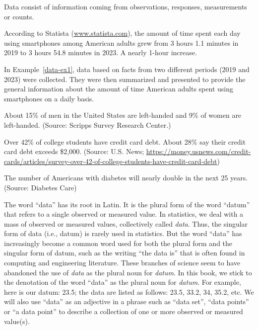 \begin{definition}[Data] 
Data consist of information coming from observations, responses, measurements or counts. 
\end{definition} 

\begin{example} \label{data-ex1}
According to Statista ({\url{www.statista.com}}), the amount of time spent each day using smartphones among American adults grew from 3 hours 1.1 minutes in 2019 to 3 hours 54.8 minutes in 2023. A nearly 1-hour increase.   
\end{example}

In Example~\ref{data-ex1}, data based on facts from two different periods (2019 and 2023) were collected. They were then summarized and presented to provide the general information about the amount of time American adults spent using smartphones on a daily basis.     

\begin{example} \label{data-ex2}
   About 15\% of men in the United States are left-handed and 9\% of women are left-handed. (Source: Scripps Survey Research Center.)   
 \end{example}

\begin{example} \label{data-ex3}
 Over 42\% of college students have credit card debt. About 28\% say their credit card debt exceeds \$2,000. (Source: U.S. News; {\url{https://money.usnews.com/credit-cards/articles/survey-over-42-of-college-students-have-credit-card-debt}})
\end{example}

\begin{example} \label{data-ex4}
 The number of Americans with diabetes will nearly double in the next 25 years. (Source: Diabetes Care)
\end{example}

The word ``data'' has its root in Latin. It is the plural form of the word ``datum'' that refers to a single observed or measured value. In statistics, we deal with a mass of observed or measured values, collectively called {\it{data}}. Thus, the singular form of data (i.e., datum) is rarely used in statistics. But the word ``data'' has increasingly become a common word used for both the plural form and the singular form of datum, such as the writing ``the data is'' that is often found in computing and engineering literature. These branches of science seem to have abandoned the use of {\it{data}} as the plural noun for {\it{datum}}. In this book, we stick to the denotation of the word ``data'' as the plural noun for {\it{datum}}. For example, here is our datum: 23.5; the data are listed as follows: 23.5, 33.2, 34, 35.2, etc. We will also use ``data'' as an adjective in a phrase such as ``data set'', ``data points'' or ``a data point'' to describe a collection of one or more observed or measured value(s).   

